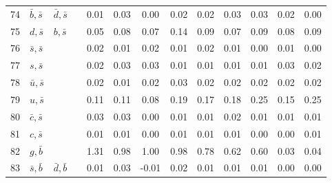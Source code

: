 \begin{tabularx}{\textwidth}{rXXX@{}S@{}S@{}S@{}S@{}S@{}S@{}S@{}S@{}S}
 74 & $\bar b, \bar s$ & $\bar d, \bar s$  &                  &  0.01 &  0.03 &  0.00 &  0.02 &  0.02 &  0.03 &  0.03 &  0.02 &  0.00 \\
 75 & $d, \bar s$      & $b, \bar s$       &                  &  0.05 &  0.08 &  0.07 &  0.14 &  0.09 &  0.07 &  0.09 &  0.08 &  0.09 \\
 76 & $\bar s, \bar s$ &                   &                  &  0.02 &  0.01 &  0.02 &  0.01 &  0.02 &  0.01 &  0.00 &  0.01 &  0.00 \\
 77 & $s, \bar s$      &                   &                  &  0.02 &  0.03 &  0.03 &  0.01 &  0.01 &  0.01 &  0.01 &  0.03 &  0.02 \\
 78 & $\bar u, \bar s$ &                   &                  &  0.02 &  0.01 &  0.02 &  0.03 &  0.02 &  0.02 &  0.02 &  0.02 &  0.02 \\
 79 & $u, \bar s$      &                   &                  &  0.11 &  0.11 &  0.08 &  0.19 &  0.17 &  0.18 &  0.25 &  0.15 &  0.25 \\
 80 & $\bar c, \bar s$ &                   &                  &  0.03 &  0.03 &  0.00 &  0.01 &  0.01 &  0.02 &  0.01 &  0.01 &  0.01 \\
 81 & $c, \bar s$      &                   &                  &  0.01 &  0.01 &  0.00 &  0.01 &  0.01 &  0.01 &  0.00 &  0.00 &  0.01 \\
 82 & $g, \bar b$      &                   &                  &  1.31 &  0.98 &  1.00 &  0.98 &  0.78 &  0.62 &  0.60 &  0.03 &  0.04 \\
 83 & $\bar s, \bar b$ & $\bar d, \bar b$  &                  &  0.01 &  0.03 & -0.01 &  0.02 &  0.01 &  0.01 &  0.01 &  0.00 &  0.00 \\
\bottomrule
\end{tabularx}
